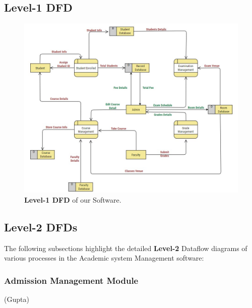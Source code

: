 \documentclass[12pt,a4paper]{article}
\begin{document}
\subsection{Level-1 DFD}
\begin{figure}[H]
    \centering
        \includegraphics[scale=0.7]{Level_1_DFD.jpg} 
    \caption{\textbf{Level-1 DFD} of our Software.}
\end{figure}


\subsection{Level-2 DFDs}
The following subsections highlight the detailed \textbf{Level-2} Dataflow diagrams of various processes in the Academic system Management software:
\subsubsection{Admission Management Module}
(Gupta)
\end{document}
